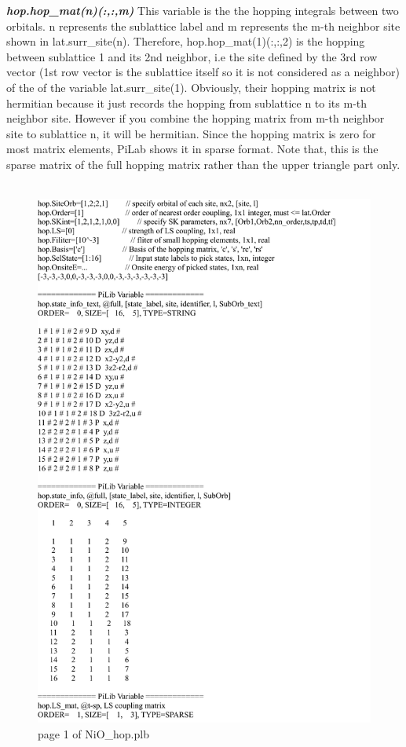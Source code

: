 \documentclass[10pt,a4paper]{article}
\begin{document}
\textit{\textbf{hop.hop\_mat(n)(:,:,m)}} This variable is the the hopping integrals between two orbitals. n represents the sublattice label and m represents the m-th neighbor site shown in lat.surr\_site(n). Therefore, hop.hop\_mat(1)(:,:,2) is the hopping between sublattice 1 and its 2nd neighbor, i.e the site defined by the 3rd row vector (1st row vector is the sublattice itself so it is not considered as a neighbor) of the of the variable lat.surr\_site(1). Obviously, their hopping matrix is not hermitian because it just records the hopping from sublattice n to its m-th neighbor site. However if you combine the hopping matrix from m-th neighbor site to sublattice n, it will be hermitian. Since the hopping matrix is zero for most matrix elements, PiLab shows it in sparse format. Note that, this is the sparse matrix of the full hopping matrix rather than the upper triangle part only. \\ \\


\begin{figure}[tbp]
\centering
\includegraphics[width=0.9\columnwidth]{NiO_hop_p1.pdf}
\caption{page 1 of NiO\_hop.plb}
\end{figure}
\end{document}
